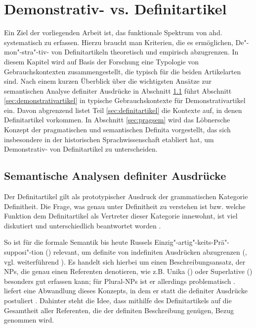 \chapter{Demonstrativ- vs. Definitartikel}\label{chap:demdef}

Ein Ziel der vorliegenden Arbeit ist, das funktionale Spektrum von ahd.  systematisch zu erfassen. Hierzu braucht man Kriterien, die es ermöglichen, De"-mon"-stra"-tiv- von Definitartikeln theoretisch und empirisch  abzugrenzen. In diesem Kapitel wird auf Basis der Forschung eine Typologie von Gebrauchskontexten zusammengestellt, die typisch für die beiden Artikelarten sind. Nach einem kurzen Überblick über die wichtigsten Ansätze zur semantischen Analyse definiter Ausdrücke in Abschnitt \ref{sec:definitheitstheorien} führt Abschnitt \ref{sec:demonstrativartikel} in typische Gebrauchskontexte für Demonstrativartikel ein. Davon abgrenzend listet Teil \ref{sec:definitartikel} die Kontexte auf, in denen Definitartikel vorkommen. In Abschnitt \ref{sec:pragsem} wird das  Löbnersche Konzept der pragmatischen und semantischen Definita vorgestellt, das sich insbesondere in der historischen Sprachwissenschaft etabliert hat, um Demonstrativ- von Definitartikel zu unterscheiden. 

\section{Semantische Analysen definiter Ausdrücke} \label{sec:definitheitstheorien}

Der Definitartikel gilt als prototypischer Ausdruck der grammatischen Kategorie Definitheit. Die Frage, was genau unter Definitheit zu verstehen ist bzw. welche Funktion dem Definitartikel als Vertreter dieser Kategorie innewohnt, ist viel diskutiert und unterschiedlich beantwortet worden \parencite[zum Überblick  s.][]{Bisle-Muller1991,Hauenschild1993,Lyons1999,Abbott2007,Cui2014}.

So ist für die formale Semantik bis heute Russels Einzig"-artig"-keits-Prä"-supposi"-tion () relevant, um definite von indefiniten Ausdrücken abzugrenzen (\cite{Russel1905}, vgl. weiterführend \cite{Heim1991,Heim2011}). Es handelt sich hierbei um einen Beschreibungsansatz, der NPs, die genau einen Referenten denotieren, wie z.B. Unika () oder Superlative () besonders gut erfassen kann; für  Plural-NPs  ist er allerdings problematisch \parencite[vgl. die Diskussion hierzu in][7--11] {Lyons1999}. \textcite{Hawkins1978} liefert eine Abwandlung dieses Konzepts, in dem er statt  die  definiter Ausdrücke postuliert \parencite[kritisch hierzu:][32]{Bisle-Muller1991}. Dahinter steht die Idee, dass mithilfe des Definitartikels auf die Gesamtheit aller Referenten, die der definiten Beschreibung genügen, Bezug genommen wird.

